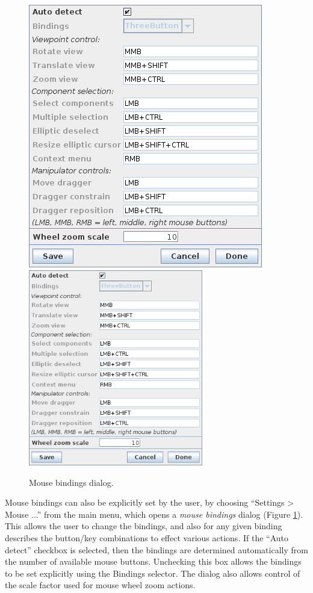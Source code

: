 \documentclass{article}
\begin{document}
\begin{figure}[h]
\begin{center}
\iflatexml
\includegraphics[]{images/mouseSettingsDialog}
\else
\includegraphics[width=3in]{images/mouseSettingsDialog}
\fi
\end{center}
\caption{Mouse bindings dialog.}%
\label{mouseSettingsDialog:fig}
\end{figure}

Mouse bindings can also be explicitly set by the user, by choosing
{\sf ``Settings > Mouse ...''} from the main menu, which opens a {\it
mouse bindings} dialog (Figure \ref{mouseSettingsDialog:fig}).  This
allows the user to change the bindings, and also for any given binding
describes the button/key combinations to effect various actions. If
the {\sf ``Auto detect''} checkbox is selected, then the bindings are
determined automatically from the number of available mouse buttons.
Unchecking this box allows the bindings to be set explicitly using the
{\sf Bindings} selector. The dialog also allows control of the scale
factor used for mouse wheel zoom actions.
\end{document}
